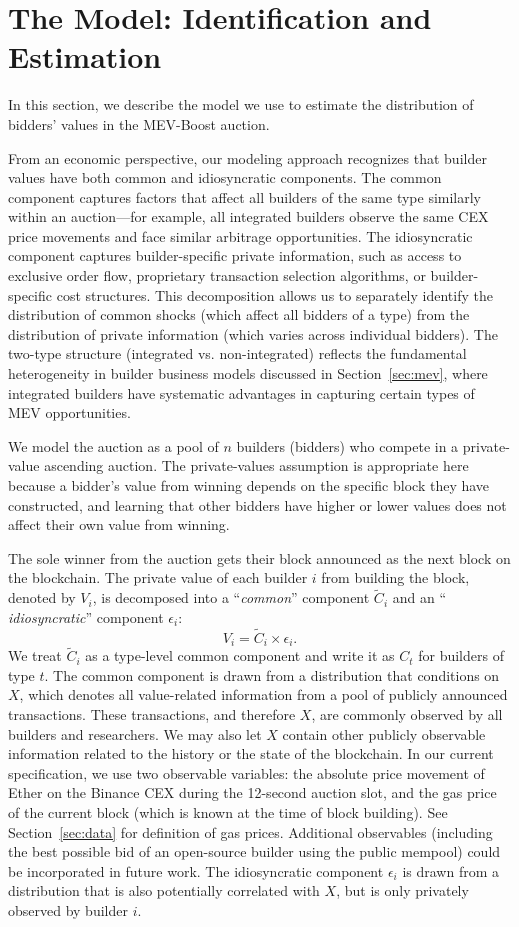 \documentclass[12pt,reqno]{amsart}
\begin{document}
\section{The Model: Identification and Estimation} \label{sec:model}
In this section, we describe the model we use to estimate the distribution of bidders' values in the MEV-Boost auction. 

From an economic perspective, our modeling approach recognizes that builder values have both common and idiosyncratic components. The common component captures factors that affect all builders of the same type similarly within an auction---for example, all integrated builders observe the same CEX price movements and face similar arbitrage opportunities. The idiosyncratic component captures builder-specific private information, such as access to exclusive order flow, proprietary transaction selection algorithms, or builder-specific cost structures. This decomposition allows us to separately identify the distribution of common shocks (which affect all bidders of a type) from the distribution of private information (which varies across individual bidders). The two-type structure (integrated vs. non-integrated) reflects the fundamental heterogeneity in builder business models discussed in Section~\ref{sec:mev}, where integrated builders have systematic advantages in capturing certain types of MEV opportunities. 


We model the auction as a pool of $n$ builders (bidders) who compete in a private-value ascending auction. The private-values assumption is appropriate here because a bidder's value from winning depends on the specific block they have constructed, and learning that other bidders have higher or lower values does not affect their own value from winning.

The sole winner from the auction gets their block announced as the next block on the blockchain. The private value of each builder $i$ from building the block, denoted by $V_{i}$, is decomposed into a ``\textit{common}'' component $\tilde{C}%
_{i} $ and an `` \textit{idiosyncratic}''
component $\epsilon _{i}$:%
\[
V_{i}=\tilde{C}_{i} \times\epsilon _{i}\text{.} 
\]%
We treat $\tilde{C}_{i}$ as a type-level common component and write it as $C_{t}$ for builders of type $t$. The common component is drawn from a distribution that conditions on $X$, which denotes all value-related information from a pool of publicly announced transactions. These transactions, and therefore $X$, are commonly observed by all builders and researchers. We may also let $X$ contain other publicly observable information related to the history or the state of the blockchain. In our current specification, we use two observable variables: the absolute price movement of Ether on the Binance CEX during the 12-second auction slot, and the gas price of the current block (which is known at the time of block building). See Section~\ref{sec:data} for definition of gas prices. Additional observables (including the best possible bid of an open-source builder using the public mempool) could be incorporated in future work. The idiosyncratic component $\epsilon_{i}$ is drawn from a distribution that is also potentially correlated with $X$, but is only privately observed by builder $i$.
\end{document}
